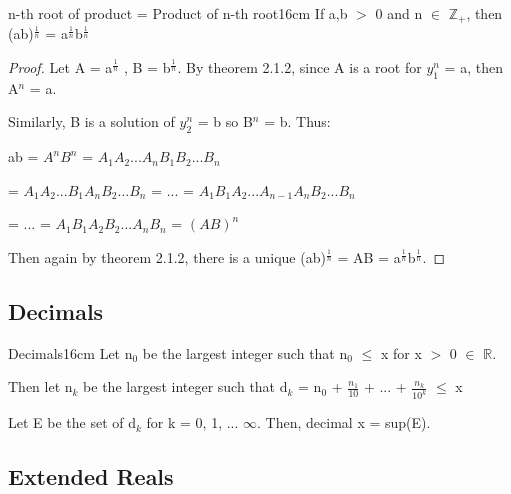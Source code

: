 	\newpage



	\begin{corollary}{n-th root of product = Product of n-th root}{16cm}
		If a,b $>$ 0 and n $\in$ $\mathbb{Z}_+$, then
		(ab)$^{\frac{1}{n}}$ = a$^{\frac{1}{n}}$b$^{\frac{1}{n}}$
	\end{corollary}
	
	\begin{proof}
		Let A = a$^{\frac{1}{n}}$ , B = b$^{\frac{1}{n}}$.
		By {\color{red} theorem 2.1.2}, since A is a root for
		$y_1^n$ = a, then A$^n$ = a.

		Similarly, B is a solution of $y_2^n$ = b so B$^n$ = b. Thus:

		\hspace{1cm} ab = $A^n$$B^n$ = $A_1A_2...A_nB_1B_2...B_n$

		\hspace{1.6cm} = $A_1A_2...B_1A_nB_2...B_n$
		= ... = $A_1B_1A_2...A_{n-1}A_nB_2...B_n$

		\hspace{1.6cm} = ... = $A_1B_1A_2B_2...A_nB_n$ = $(AB)^n$

		Then again by {\color{red} theorem 2.1.2}, there is a unique
		(ab)$^{\frac{1}{n}}$ = AB = a$^{\frac{1}{n}}$b$^{\frac{1}{n}}$.		
	\end{proof}

	\vspace{0.5cm}




	
\subsection{ Decimals }

	\begin{definition}{Decimals}{16cm}
		Let n$_0$ be the largest integer such that n$_0$ $\leq$ x for
		x $>$ 0 $\in$ $\mathbb{R}$.

		Then let n$_k$ be the largest integer such that
		d$_k$ = n$_0$ + $\frac{n_1}{10}$ + ... + $\frac{n_k}{10^k}$ $\leq$ x

		Let E be the set of d$_k$ for k = 0, 1, ... $\infty$.
		Then, {\color{lblue} decimal} x = sup(E).	
	\end{definition}

	\vspace{0.5cm}





\subsection{ Extended Reals }

